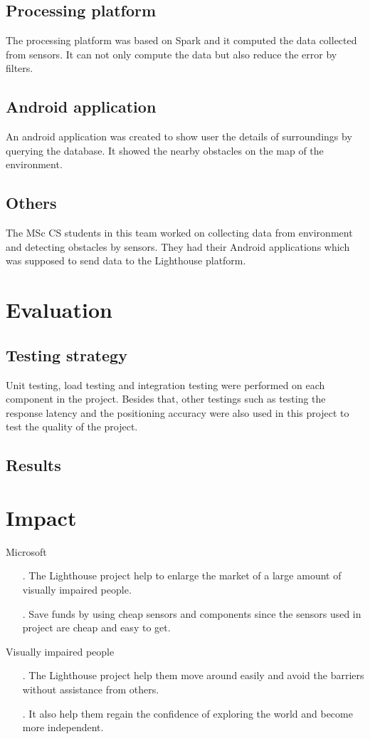 \documentclass[prodmode,acmtosem]{acmsmall} %
\begin{document}
\subsection{Processing platform}
The processing platform was based on Spark and it computed the data collected from sensors. It can not only compute the data but also reduce the error by filters.
\subsection{Android application}
An android application was created to show user the details of surroundings by querying the database. It showed the nearby obstacles on the map of the environment.
\subsection{Others}
The MSc CS students in this team worked on collecting data from environment and detecting obstacles by sensors. They had their Android applications which was supposed to send data to the Lighthouse platform.
\section{Evaluation}
\subsection{Testing strategy}
Unit testing, load testing and integration testing were performed on each component in the project. Besides that, other testings such as testing the response latency and the positioning accuracy were also used in this project to test the quality of the project.
\subsection{Results}

\section{Impact}
Microsoft
\begin{itemize}
\item[.] The Lighthouse project help to enlarge the market of a large amount of visually impaired people.\\
\item[.] Save funds by using cheap sensors and components since the sensors used in project are cheap and easy to get.
\end{itemize}
Visually impaired people
\begin{itemize}
\item[.] The Lighthouse project help them move around easily and avoid the barriers without assistance from others.\\
\item[.] It also help them regain the confidence of exploring the world and become more independent.
\end{itemize}
\end{document}
